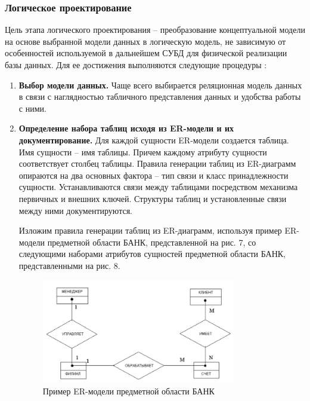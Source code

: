 \subsubsection{Логическое  проектирование}

Цель этапа логического проектирования – преобразование концептуальной модели на основе выбранной модели данных
в логическую модель, не зависимую от особенностей используемой в дальнейшем СУБД для физической реализации базы
данных. Для ее достижения выполняются следующие процедуры \autocite{oscerko}:
\begin{enumerate}
    \item \textbf{Выбор модели данных.}
        Чаще всего выбирается реляционная модель данных в связи с наглядностью табличного представления данных
        и удобства работы с ними.

    \item \textbf{Определение набора таблиц исходя из ER-модели и их документирование.}
        Для каждой сущности ER-модели создается таблица. Имя сущности – имя таблицы. Причем каждому атрибуту
        сущности соответствует столбец таблицы. Правила генерации таблиц из ER-диаграмм опираются на два основных
        фактора – тип связи и класс принадлежности сущности. Устанавливаются связи между таблицами посредством
        механизма первичных и внешних ключей. Структуры таблиц и установленные связи между ними документируются.

        Изложим правила генерации таблиц из ER-диаграмм, используя пример ER-модели предметной
        области БАНК, представленной на рис. 7, со следующими наборами атрибутов сущностей предметной области БАНК,
        представленными на рис. 8.

    \begin{figure}[H]
        \centering
        \includegraphics[width=0.8\textwidth]{assets/security/pic2.png}
        \caption{Пример ER-модели предметной области БАНК}
        \label{fig:mesh04}
    \end{figure}


\end{enumerate}
